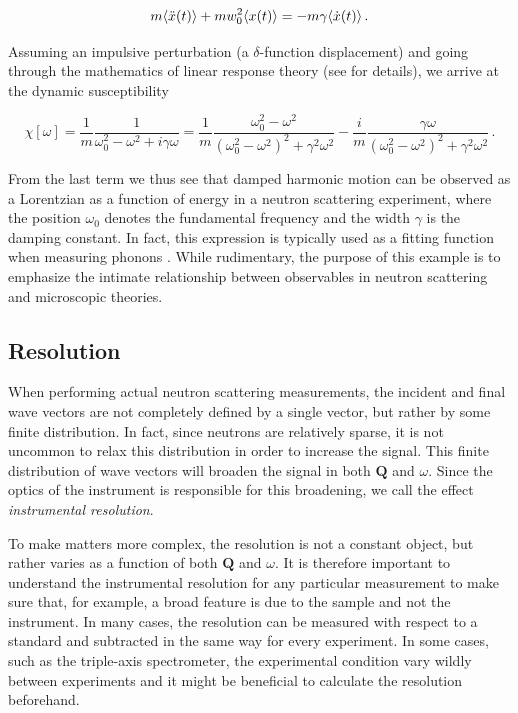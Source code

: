 \[ m \langle \ddot{x}(t) \rangle + m w_0^2 \langle x(t) \rangle = - m\gamma\langle \dot{x}(t) \rangle \, . \]

\noindent Assuming an impulsive perturbation (a $\delta$-function displacement) and going through the mathematics of linear response theory (see \cite{Lovesey1984} for details), we arrive at the dynamic susceptibility

\begin{equation}\label{eq:sqw_dho}
\chi[\omega] = \frac{1}{m}\frac{1}{\omega_0^2 - \omega^2 + i\gamma\omega} = \frac{1}{m} \frac{\omega_0^2 - \omega^2}{(\omega_0^2-\omega^2)^2 + \gamma^2\omega^2} - \frac{i}{m}\frac{\gamma\omega}{(\omega_0^2-\omega^2)^2 + \gamma^2\omega^2} \, .
\end{equation}

\noindent From the last term we thus see that damped harmonic motion can be observed as a Lorentzian as a function of energy in a neutron scattering experiment, where the position $\omega_0$ denotes the fundamental frequency and the width $\gamma$ is the damping constant. In fact, this expression is typically used as a fitting function when measuring phonons \cite{Fak1997}. While rudimentary, the purpose of this example is to emphasize the intimate relationship between observables in neutron scattering and microscopic theories.

\subsection{Resolution}
When performing actual neutron scattering measurements, the incident and final wave vectors are not completely defined by a single vector, but rather by some finite distribution. In fact, since neutrons are relatively sparse, it is not uncommon to relax this distribution in order to increase the signal. This finite distribution of wave vectors will broaden the signal in both $\bm{Q}$ and $\omega$. Since the optics of the instrument is responsible for this broadening, we call the effect \emph{instrumental resolution}.

To make matters more complex, the resolution is not a constant object, but rather varies as a function of both $\bm{Q}$ and $\omega$. It is therefore important to understand the instrumental resolution for any particular measurement to make sure that, for example, a broad feature is due to the sample and not the instrument. In many cases, the resolution can be measured with respect to a standard and subtracted in the same way for every experiment. In some cases, such as the triple-axis spectrometer, the experimental condition vary wildly between experiments and it might be beneficial to calculate the resolution beforehand.

